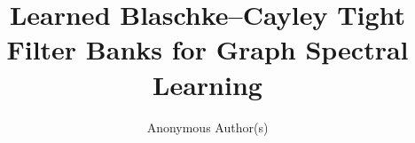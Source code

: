 \documentclass{article}
\title{Learned Blaschke--Cayley Tight Filter Banks for Graph Spectral Learning}
\author{Anonymous Author(s)}
\begin{document}
\raggedbottom
\maketitle








\FloatBarrier




\FloatBarrier

\appendix

\FloatBarrier

\FloatBarrier
\clearpage

\FloatBarrier

\end{document}
